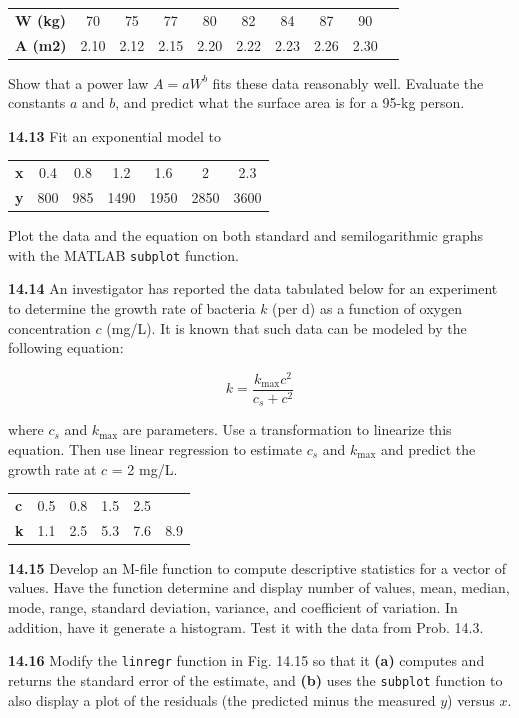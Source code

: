 \documentclass[../main.tex]{subfiles}
\begin{document}
\begin{multicols}{2}
	\noindent \begin{tabular}{l c c c c c c c c c}
		\textbf{W (kg)} & 70 & 75 & 77 & 80 & 82 & 84 & 87 & 90 \\
		\textbf{A (m2)} & 2.10 & 2.12 & 2.15 & 2.20 & 2.22 & 2.23 & 2.26 & 2.30 &
  	\end{tabular}

	\noindent Show that a power law $A = aW^b$ fits these data reasonably
	well. Evaluate the constants $a$ and $b$, and predict what the
	surface area is for a 95-kg person.

	\noindent\textbf{14.13} Fit an exponential model to

	\noindent \begin{tabular}{l c c c c c c }
		\textbf{x} & 0.4 & 0.8 & 1.2 & 1.6 & 2 & 2.3 \\
		\textbf{y} & 800 & 985 & 1490 & 1950 & 2850 & 3600
  	\end{tabular}

	\noindent Plot the data and the equation on both standard and semilogarithmic graphs with the MATLAB \texttt{subplot} function.

	\noindent\textbf{14.14} An investigator has reported the data tabulated below
	for an experiment to determine the growth rate of bacteria
	$k$ (per d) as a function of oxygen concentration $c$ (mg/L). It
	is known that such data can be modeled by the following
	equation:

	$$k = \frac{k_{\text{max}} c^2}{c_s + c^2}$$

	\noindent where $c_s$ and $k_{\text{max}}$ are parameters. Use a transformation to
	linearize this equation. Then use linear regression to estimate $c_s$ and $k_{\text{max}}$ and predict the growth rate at $c$ = 2 mg/L.

	\noindent \begin{tabular}{l c c c c c}
		\textbf{c} & 0.5 & 0.8 & 1.5 & 2.5 \\
		\textbf{k} & 1.1 & 2.5 & 5.3 & 7.6 & 8.9
  	\end{tabular}

	\noindent\textbf{14.15} Develop an M-file function to compute descriptive
	statistics for a vector of values. Have the function determine
	and display number of values, mean, median, mode, range,
	standard deviation, variance, and coefficient of variation. In
	addition, have it generate a histogram. Test it with the data
	from Prob. 14.3.

	\noindent\textbf{14.16}  Modify the \texttt{linregr} function in Fig. 14.15 so that it
	\textbf{(a)} computes and returns the standard error of the estimate,
	and \textbf{(b)} uses the \texttt{subplot} function to also display a plot of
	the residuals (the predicted minus the measured $y$) versus $x$.


\end{multicols}
\end{document}
